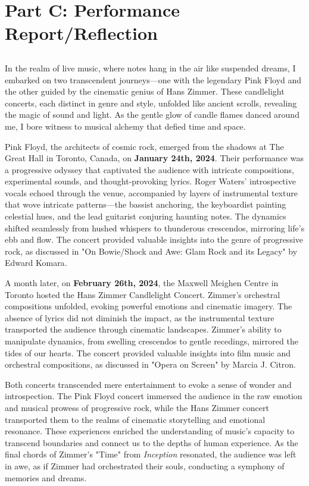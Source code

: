 
\section{Part C: Performance Report/Reflection}
\subsection{}
In the realm of live music, where notes hang in the air like suspended dreams, I embarked on two transcendent journeys—one with the legendary Pink Floyd and the other guided by the cinematic genius of Hans Zimmer. These candlelight concerts, each distinct in genre and style, unfolded like ancient scrolls, revealing the magic of sound and light. As the gentle glow of candle flames danced around me, I bore witness to musical alchemy that defied time and space.

Pink Floyd, the architects of cosmic rock, emerged from the shadows at The Great Hall in Toronto, Canada, on \textbf{January 24th, 2024}. Their performance was a progressive odyssey that captivated the audience with intricate compositions, experimental sounds, and thought-provoking lyrics. Roger Waters' introspective vocals echoed through the venue, accompanied by layers of instrumental texture that wove intricate patterns—the bassist anchoring, the keyboardist painting celestial hues, and the lead guitarist conjuring haunting notes. The dynamics shifted seamlessly from hushed whispers to thunderous crescendos, mirroring life's ebb and flow. The concert provided valuable insights into the genre of progressive rock, as discussed in "On Bowie/Shock and Awe: Glam Rock and its Legacy" by Edward Komara\autocite{reynolds}.

A month later, on \textbf{February 26th, 2024}, the Maxwell Meighen Centre in Toronto hosted the Hans Zimmer Candlelight Concert. Zimmer's orchestral compositions unfolded, evoking powerful emotions and cinematic imagery. The absence of lyrics did not diminish the impact, as the instrumental texture transported the audience through cinematic landscapes. Zimmer's ability to manipulate dynamics, from swelling crescendos to gentle recedings, mirrored the tides of our hearts. The concert provided valuable insights into film music and orchestral compositions, as discussed in "Opera on Screen" by Marcia J. Citron\autocite{citron2000opera}.

Both concerts transcended mere entertainment to evoke a sense of wonder and introspection. The Pink Floyd concert immersed the audience in the raw emotion and musical prowess of progressive rock, while the Hans Zimmer concert transported them to the realms of cinematic storytelling and emotional resonance. These experiences enriched the understanding of music's capacity to transcend boundaries and connect us to the depths of human experience. As the final chords of Zimmer's "Time" from \textit{Inception} resonated, the audience was left in awe, as if Zimmer had orchestrated their souls, conducting a symphony of memories and dreams.

